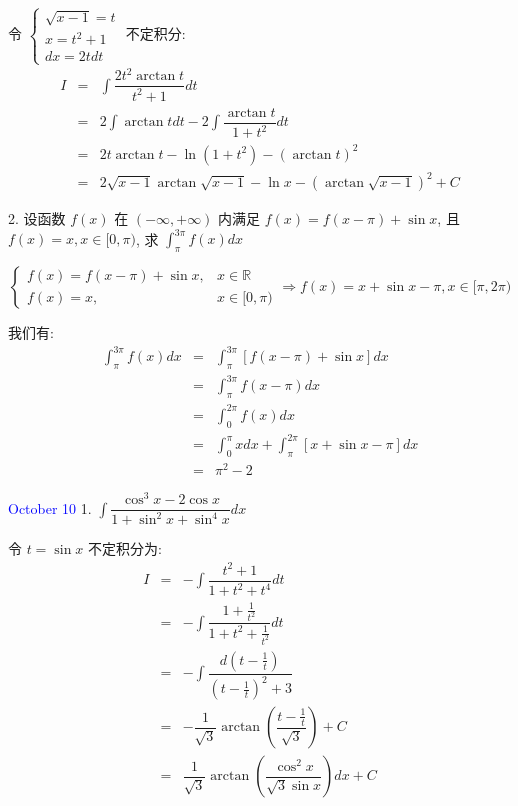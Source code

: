 \begin{solution}

	令 $
	\begin{cases}
		\sqrt{x-1} = t\\
		x = t^{2} + 1\\
		dx = 2tdt
	\end{cases}$ 不定积分:  
	\begin{eqnarray*}
		I & = & \int \dfrac{2t^2\arctan t}{t^2+1}dt\\
		  & = & 2\int \arctan tdt-2\int\dfrac{\arctan t}{1+t^2}dt\\
		  & = & 2t\arctan t-\ln(1+t^2)-(\arctan t)^2\\
		  & = & 2\sqrt{x-1}\arctan \sqrt{x-1}-\ln x-(\arctan\sqrt{x-1})^2+C
	\end{eqnarray*}
\end{solution}


2. 设函数 $f(x)$ 在 $(-\infty,+\infty)$ 内满足 $f(x)=f(x-\pi)+\sin x$, 且 $f(x)=x,x\in[0,\pi)$, 求 $\displaystyle{\int_{\pi}^{3\pi}f(x)dx}$

\begin{solution}

	$$\begin{cases}
		f(x) = f(x-\pi)+\sin x, & x\in \mathbb{R}\\
		f(x) = x, &x\in[0,\pi)
	\end{cases}  
	\Rightarrow
	f(x) = x+\sin x-\pi,x\in[\pi,2\pi)$$
	
	我们有:  
	\begin{eqnarray*}
		\int_{\pi}^{3\pi}f(x)dx & = & \int_{\pi}^{3\pi}[f(x-\pi)+\sin x]dx\\
								& = & \int_{\pi}^{3\pi}f(x-\pi)dx\\
								& = & \int_{0}^{2\pi}f(x)dx\\
								& = & \int_{0}^{\pi}xdx+\int_{\pi}^{2\pi}[x+\sin x-\pi]dx\\
								& = & \pi^2-2
	\end{eqnarray*}
\end{solution}


\textcolor{blue}{October 10}
1. $\displaystyle{\int \dfrac{\cos^3 x-2\cos x}{1+\sin^2 x+\sin^4 x}dx}$

\begin{solution}

	令 $t=\sin x$ 不定积分为:  
	\begin{eqnarray*}
		I & = & -\int \dfrac{t^2+1}{1+t^2+t^4}dt\\
		  & = & -\int \dfrac{1+\frac{1}{t^2}}{1+t^2+\frac{1}{t^2}}dt\\
		  & = & -\int \dfrac{d(t-\frac{1}{t})}{(t-\frac{1}{t})^2+3}\\
		  & = & -\dfrac{1}{\sqrt{3}}\arctan(\dfrac{t-\frac{1}{t}}{\sqrt{3}})+C\\
		  & = & \dfrac{1}{\sqrt{3}}\arctan(\dfrac{\cos^2 x}{\sqrt{3}\sin x})dx+C
	\end{eqnarray*}
\end{solution}


